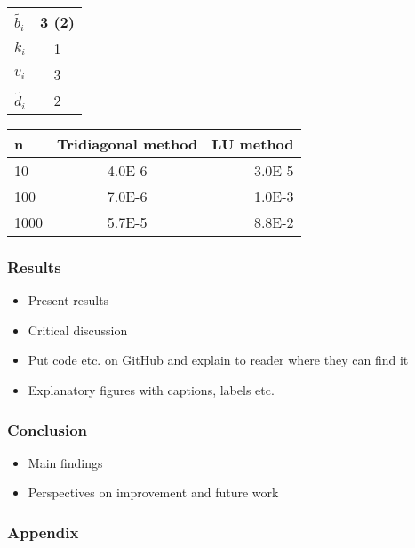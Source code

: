 \documentclass[12pt]{article}
\begin{document}
\begin{center}
  \begin{tabular}{ l | c }
    $\tilde{b_i}$ & 3 (2) \\ \hline
    $k_i$& 1 \\ \hline
    $v_i$ & 3 \\ \hline
    $\tilde{d_i}$ & 2
  \end{tabular}
\end{center}
\begin{center}
  \begin{tabular}{ l | c | r }
    n & Tridiagonal method & LU method \\ \hline
    10 & 4.0E-6 & 3.0E-5 \\ \hline
    100 & 7.0E-6 & 1.0E-3 \\ \hline
    1000 & 5.7E-5& 8.8E-2 \\
  \end{tabular}
\end{center}
\subsubsection*{Results}

\begin{itemize}
\item Present results
\item Critical discussion
\item Put code etc. on GitHub and explain to reader where they can find it
\item Explanatory figures with captions, labels etc.
\end{itemize}

\subsubsection*{Conclusion}

\begin{itemize}
\item Main findings
\item Perspectives on improvement and future work
\end{itemize}

\subsubsection*{Appendix}
\end{document}
